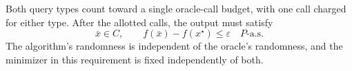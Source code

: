 \documentclass[10pt]{article}
\theoremstyle{definition}
\begin{document}
Both query types count toward a single oracle-call budget, with one call charged for either type. After the allotted calls, the output must satisfy
\[
\bar{x}\in C,
\qquad f(\bar{x})-f(x^\star)\leq\varepsilon
\quad P\text{-a.s.}
\]
The algorithm's randomness is independent of the oracle's randomness, and the minimizer in this requirement is fixed independently of both.
\end{document}
